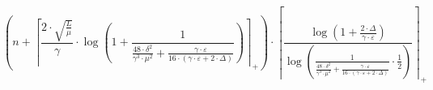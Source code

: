 \[\left(n + \left\lceil \frac{2 \cdot \sqrt{\frac{L}{\mu}}}{\gamma} \cdot \log\left(1 + \frac{1}{\frac{48 \cdot \delta^{2}}{\gamma^{3} \cdot \mu^{2}} + \frac{\gamma \cdot \varepsilon}{16 \cdot \left(\gamma \cdot \varepsilon + 2 \cdot \Delta\right)}}\right) \right\rceil_{+}\right) \cdot \left\lceil \frac{\log\left(1 + \frac{2 \cdot \Delta}{\gamma \cdot \varepsilon}\right)}{\log\left(\frac{1}{\frac{48 \cdot \delta^{2}}{\gamma^{3} \cdot \mu^{2}} + \frac{\gamma \cdot \varepsilon}{16 \cdot \left(\gamma \cdot \varepsilon + 2 \cdot \Delta\right)}} \cdot \frac{1}{2}\right)} \right\rceil_{+}\]
